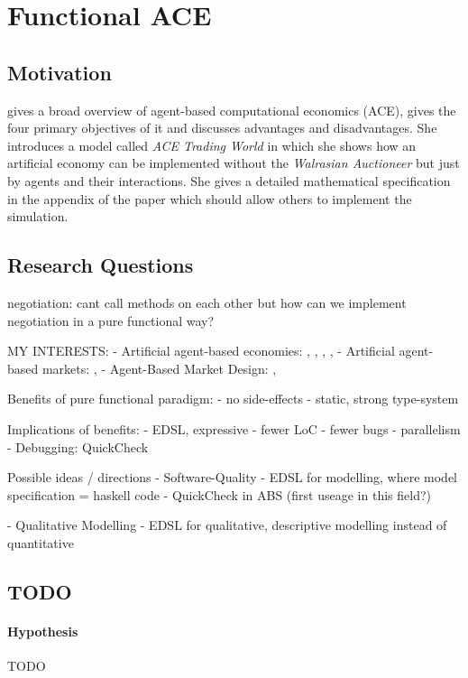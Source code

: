 \section{Functional ACE}

\subsection{Motivation}
\cite{tesfatsion_agent-based_2006} gives a broad overview of agent-based computational economics (ACE), gives the four primary objectives of it and discusses advantages and disadvantages. She introduces a model called \textit{ACE Trading World} in which she shows how an artificial economy can be implemented without the \textit{Walrasian Auctioneer} but just by agents and their interactions. She gives a detailed mathematical specification in the appendix of the paper which should allow others to implement the simulation.

\subsection{Research Questions}

negotiation: cant call methods on each other but how can we implement negotiation in a pure functional way?

MY INTERESTS:
- Artificial agent-based economies: \cite{tesfatsion_agent-based_2006}, \cite{gintis_emergence_2006}, \cite{gintis_dynamics_2007}, \cite{gaffeo_adaptive_2008}, \cite{botta_functional_2011}
- Artificial agent-based markets: \cite{mackie-mason_chapter_2006}, \cite{darley_nasdaq_2007}
- Agent-Based Market Design: \cite{marks_chapter_2006}, \cite{budish_editors_2015}

Benefits of pure functional paradigm:
- no side-effects
- static, strong type-system

Implications of benefits:
- EDSL, expressive
- fewer LoC
- fewer bugs
- parallelism
- Debugging: QuickCheck

Possible ideas / directions
- Software-Quality
	- EDSL for modelling, where model specification = haskell code
	- QuickCheck in ABS (first useage in this field?)

- Qualitative Modelling
	- EDSL for qualitative, descriptive modelling instead of quantitative

\subsection{TODO}
\paragraph{Hypothesis} TODO
